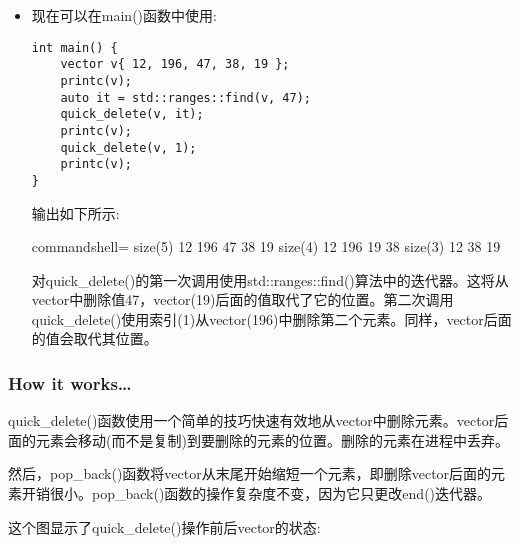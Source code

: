 \begin{itemize}
\item 
现在可以在main()函数中使用:

\begin{lstlisting}[style=styleCXX]
int main() {
	vector v{ 12, 196, 47, 38, 19 };
	printc(v);
	auto it = std::ranges::find(v, 47);
	quick_delete(v, it);
	printc(v);
	quick_delete(v, 1);
	printc(v);
}
\end{lstlisting}

输出如下所示:

\begin{tcblisting}{commandshell={}}
size(5) 12 196 47 38 19
size(4) 12 196 19 38
size(3) 12 38 19
\end{tcblisting}

对quick\_delete()的第一次调用使用std::ranges::find()算法中的迭代器。这将从vector中删除值47，vector(19)后面的值取代了它的位置。第二次调用quick\_delete()使用索引(1)从vector(196)中删除第二个元素。同样，vector后面的值会取代其位置。
\end{itemize}

\subsubsection{How it works…}

quick\_delete()函数使用一个简单的技巧快速有效地从vector中删除元素。vector后面的元素会移动(而不是复制)到要删除的元素的位置。删除的元素在进程中丢弃。

然后，pop\_back()函数将vector从末尾开始缩短一个元素，即删除vector后面的元素开销很小。pop\_back()函数的操作复杂度不变，因为它只更改end()迭代器。

这个图显示了quick\_delete()操作前后vector的状态:

